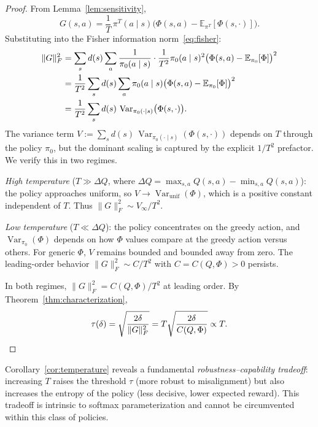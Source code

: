 \begin{proof}
From Lemma~\ref{lem:sensitivity},
\[
G(s,a) = \frac{1}{T}\, \pi^T(a \mid s) \bigl(\Phi(s,a) -
  \mathbb{E}_{\pi^T}[\Phi(s,\cdot)]\bigr).
\]
Substituting into the Fisher information norm~\eqref{eq:fisher}:
\begin{align}
\lVert G \rVert_F^2 &= \sum_s d(s) \sum_a \frac{1}{\pi_0(a \mid s)}
  \cdot \frac{1}{T^2} \pi_0(a \mid s)^2 \bigl(\Phi(s,a) -
  \mathbb{E}_{\pi_0}[\Phi]\bigr)^2 \notag \\
&= \frac{1}{T^2} \sum_s d(s) \sum_a \pi_0(a \mid s) \bigl(\Phi(s,a) -
  \mathbb{E}_{\pi_0}[\Phi]\bigr)^2 \notag \\
&= \frac{1}{T^2} \sum_s d(s)\, \operatorname{Var}_{\pi_0(\cdot \mid s)}
  \bigl(\Phi(s,\cdot)\bigr). \label{eq:fisher-var}
\end{align}
The variance term $V := \sum_s d(s)\, \operatorname{Var}_{\pi_0(\cdot \mid s)}
(\Phi(s,\cdot))$ depends on $T$ through the policy $\pi_0$, but the dominant
scaling is captured by the explicit $1/T^2$ prefactor. We verify this in two
regimes.

\emph{High temperature} ($T \gg \Delta Q$, where $\Delta Q = \max_{s,a}
Q(s,a) - \min_{s,a} Q(s,a)$): the policy approaches uniform, so $V \to
\operatorname{Var}_{\mathrm{unif}}(\Phi)$, which is a positive constant
independent of $T$. Thus $\lVert G \rVert_F^2 \sim V_\infty / T^2$.

\emph{Low temperature} ($T \ll \Delta Q$): the policy concentrates on the
greedy action, and $\operatorname{Var}_{\pi_0}(\Phi)$ depends on how
$\Phi$ values compare at the greedy action versus others. For generic $\Phi$,
$V$ remains bounded and bounded away from zero. The leading-order behavior
$\lVert G \rVert_F^2 \sim C/T^2$ with $C = C(Q, \Phi) > 0$ persists.

In both regimes, $\lVert G \rVert_F^2 = C(Q,\Phi)/T^2$ at leading order.
By Theorem~\ref{thm:characterization},
\[
\tau(\delta) = \sqrt{\frac{2\delta}{\lVert G \rVert_F^2}}
  = T \sqrt{\frac{2\delta}{C(Q,\Phi)}} \propto T.
\qedhere
\]
\end{proof}

\begin{remark}\label{rem:tradeoff}
Corollary~\ref{cor:temperature} reveals a fundamental
\emph{robustness--capability tradeoff}: increasing $T$ raises the threshold
$\tau$ (more robust to misalignment) but also increases the entropy of the
policy (less decisive, lower expected reward). This tradeoff is intrinsic to
softmax parameterization and cannot be circumvented within this class of
policies.
\end{remark}

